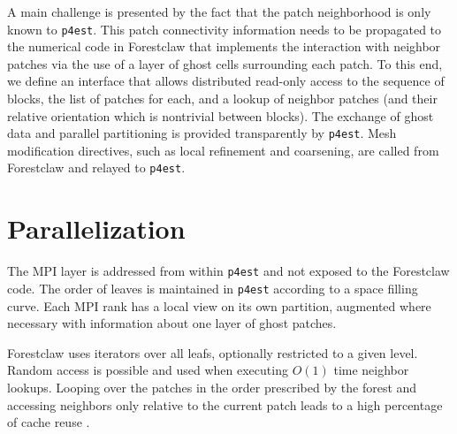 \documentclass{IOS-Book-Article}     %
\newcommand{\comment}[1]{\textcolor{green}{[DAC: #1]}\xspace}
\newcommand{\forestclaw}{Forestclaw\xspace}
\newcommand{\pforest}{\texttt{p4est}\xspace}
\begin{document}
A main challenge is presented by the fact that the patch neighborhood
is only known to \pforest.  This patch connectivity information needs
to be propagated to the numerical code in \forestclaw that implements
the interaction with neighbor patches via the use of a layer of ghost
cells surrounding each patch.  To this end, we define an interface
that allows distributed read-only access to the sequence of blocks,
the list of patches for each, and a lookup of neighbor patches (and
their relative orientation which is nontrivial between blocks).  The
exchange of ghost data and parallel partitioning is provided
transparently by \pforest.  Mesh modification directives, such as
local refinement and coarsening, are called from \forestclaw and
relayed to \pforest.








\section{Parallelization}

The MPI layer is addressed from within \pforest and not exposed to the
\forestclaw code.  The order of leaves is maintained in \pforest according to a
space filling curve.  Each MPI rank has a local view on its own partition,
augmented where necessary with information about one layer of ghost patches.

\forestclaw uses iterators over all leafs, optionally restricted to a given
level.  Random access is possible and used when executing $O(1)$ time neighbor
lookups.  Looping over the patches in the order prescribed by the forest
and
accessing neighbors only relative to the current patch leads to a high
percentage of cache reuse
\cite{BursteddeBurtscherGhattasEtAl09}.
\end{document}
